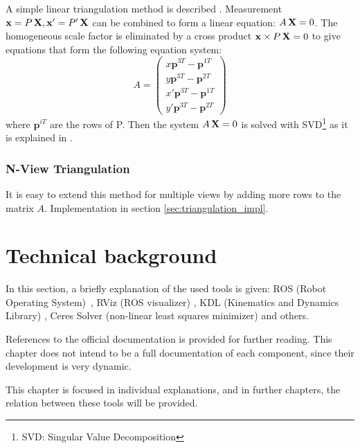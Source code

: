 A simple linear triangulation method is described \cite{HZ2}. Measurement $\mathbf{x} = P \, \mathbf{X} , \mathbf{x'} = P' \, \mathbf{X}$ can be combined to form a linear equation: $A\, \mathbf{X} = 0$. The homogeneous scale factor is eliminated by a cross product $\mathbf{x} \times P\,\mathbf{X} = 0$ to give equations that form the following equation system:
\begin{equation}
A =
\begin{pmatrix}
  x \mathbf{p}^{3T} - \mathbf{p}^{1T} \\
  y \mathbf{p}^{3T} - \mathbf{p}^{2T} \\
  x' \mathbf{p}^{3T} - \mathbf{p}^{1T} \\
  y' \mathbf{p}^{3T} - \mathbf{p}^{2T}
\end{pmatrix}
\end{equation}
where $\mathbf{p}^{iT}$ are the rows of P. Then the system $A\, \mathbf{X} = 0$ is solved with SVD\footnote{SVD: Singular Value Decomposition} as it is explained in \cite{HZ2}.




\subsubsection{N-View Triangulation}
\label{sec:nview_triangulation}

It is easy to extend this method for multiple views by adding more rows to the matrix $A$. Implementation in section \ref{sec:triangulation_impl}.





\section{Technical background}
\label{cha:technical_background}

In this section, a briefly explanation of the used tools is given: ROS (Robot Operating System)~\cite{ROS}, RViz (ROS visualizer) \cite{RViz}, KDL (Kinematics and Dynamics Library) \cite{KDL}, Ceres Solver (non-linear least squares minimizer) \cite{ceres} and others.

References to the official documentation is provided for further reading. This chapter does not intend to be a full documentation of each component, since their development is very dynamic.

This chapter is focused in individual explanations, and in further chapters, the relation between these tools will be provided.

